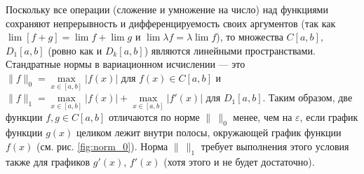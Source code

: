 Поскольку все операции (сложение и умножение на число) над функциями сохраняют
непрерывность и дифференцируемость своих аргументов (так как $ \lim[f + g] =
\lim f + \lim g $ и $ \lim \lambda f = \lambda \lim f $), то множества $ C[a,b]
$, $ D_1[a,b] $ (ровно как и $ D_k[a,b] $) являются линейными пространствами.
Стандратные нормы в вариационном исчислении --- это $ \|f\|_0 =
\max\limits_{x\in[a,b]}|f(x)| $ для
$ f(x) \in C[a,b]$ и $ \|f\|_1 = \max\limits_{x\in[a,b]}|f(x)| +
\max\limits_{x\in[a,b]}|f'(x)| $ для $ D_1[a,b] $. Таким образом, две функции $ f, g \in C[a,b] $  отличаются по норме
$ \|\ \|_0 $ менее, чем на $ \varepsilon $, если график функции $ g(x) $ целиком
лежит внутри полосы, окружающей график функции $ f(x) $ (см. рис. \ref{fig:norm_0}).
Норма $ \|\ \|_1 $ требует выполнения этого условия также для графиков $ g'(x)$,
$f'(x) $ (хотя этого и не будет достаточно).

